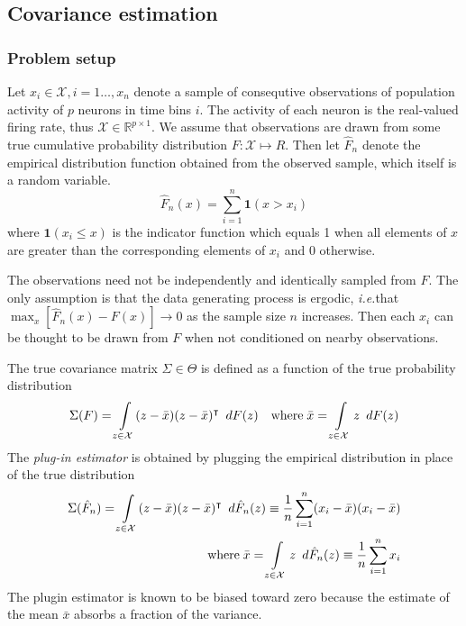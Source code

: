 \subsection{Covariance estimation}

\subsubsection{Problem setup}

Let $x_i \in \mathcal X, i=1\ldots,x_n$ denote a sample of consequtive observations of population activity of $p$ neurons in time bins $i$.  
The activity of each neuron is the real-valued firing rate, thus  $\mathcal X \in \mathbb R^{p\times 1}$.  
We assume that observations are drawn from some true cumulative probability distribution $F: \mathcal X \mapsto R$. Then let $\hat F_n$ denote the empirical distribution function obtained from the observed sample, which itself is a random variable.
\begin{equation}
\hat F_n(x) = \sum\limits_{i=1}^n \mathbf{1}(x > x_i)
\end{equation}
where $\mathbf 1(x_i \le x)$ is the indicator function which equals 1 when all elements of $x$ are greater than the corresponding elements of $x_i$ and 0 otherwise.

The observations need not be independently and identically sampled from $F$. The only assumption is that the data generating process is ergodic, \emph{i.e.}\;that $\max_x \left[\hat F_n(x) - F(x)\right] \to 0$ as the sample size $n$ increases. Then each $x_i$ can be thought to be drawn from $F$ when not conditioned on nearby observations.

The true covariance matrix $\Sigma \in \Theta$ is defined as a function of the true probability distribution
\begin{equation}
\Sigma(F) = \int\limits_{z\in\mathcal X} (z - \bar x)(z - \bar x)^\intercal \mathop{}\,d F(z)
\quad\mbox{where}\;
\bar x = \int\limits_{z\in\mathcal X} z \mathop{}\,d F(z)
\end{equation}
The \emph{plug-in estimator} is obtained by plugging the empirical distribution in place of the true distribution
\begin{equation}
\begin{split}
\Sigma(\hat F_n) = \int\limits_{z\in\mathcal X} (z - \bar x)(z - \bar x)^\intercal \mathop{}\,d \hat F_n(z) 
\equiv \frac  1 n\sum\limits_{i=1}^n (x_i-\bar x)(x_i - \bar x)
\\
\mbox{where}\;\bar x = 
\int\limits_{z\in \mathcal X}z \mathop{}\,d \hat F_n(z) \equiv \frac 1 n\sum\limits_{i=1}^n x_i
\end{split}
\end{equation}
The plugin estimator is known to be biased toward zero because the estimate of the mean $\bar x$ absorbs a fraction of the variance. 

